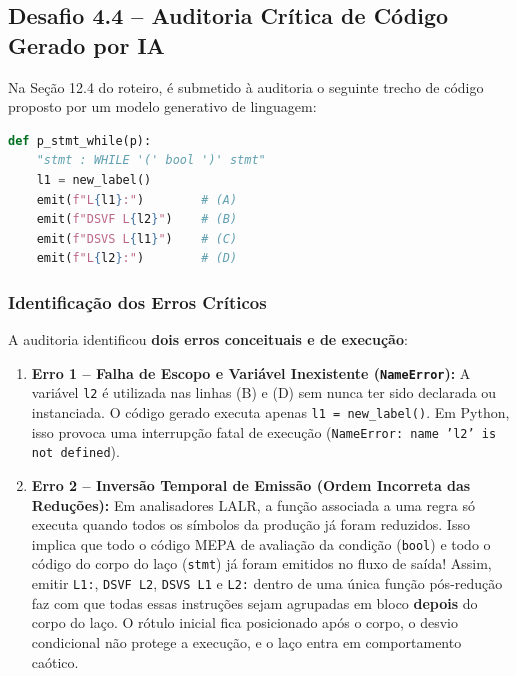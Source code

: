 \documentclass[12pt,a4paper]{article}
\begin{document}
\subsection{Desafio 4.4 -- Auditoria Crítica de Código Gerado por IA}

Na Seção 12.4 do roteiro, é submetido à auditoria o seguinte trecho de código
proposto por um modelo generativo de linguagem:

\begin{lstlisting}[language=Python]
def p_stmt_while(p):
    "stmt : WHILE '(' bool ')' stmt"
    l1 = new_label()
    emit(f"L{l1}:")        # (A)
    emit(f"DSVF L{l2}")    # (B)
    emit(f"DSVS L{l1}")    # (C)
    emit(f"L{l2}:")        # (D)
\end{lstlisting}

\subsubsection{Identificação dos Erros Críticos}

A auditoria identificou \textbf{dois erros conceituais e de execução}:

\begin{enumerate}
    \item \textbf{Erro 1 -- Falha de Escopo e Variável Inexistente (\texttt{NameError}):}
          A variável \texttt{l2} é utilizada nas linhas (B) e (D) sem nunca ter sido
          declarada ou instanciada. O código gerado executa apenas \texttt{l1 = new\_label()}.
          Em Python, isso provoca uma interrupção fatal de execução (\texttt{NameError: name 'l2' is not defined}).
    \item \textbf{Erro 2 -- Inversão Temporal de Emissão (Ordem Incorreta das Reduções):}
          Em analisadores LALR, a função associada a uma regra só executa quando todos os
          símbolos da produção já foram reduzidos. Isso implica que todo o código MEPA
          de avaliação da condição (\texttt{bool}) e todo o código do corpo do laço
          (\texttt{stmt}) já foram emitidos no fluxo de saída!
          Assim, emitir \texttt{L1:}, \texttt{DSVF L2}, \texttt{DSVS L1} e \texttt{L2:}
          dentro de uma única função pós-redução faz com que todas essas instruções
          sejam agrupadas em bloco \textbf{depois} do corpo do laço. O rótulo inicial
          fica posicionado após o corpo, o desvio condicional não protege a execução,
          e o laço entra em comportamento caótico.
\end{enumerate}
\end{document}
